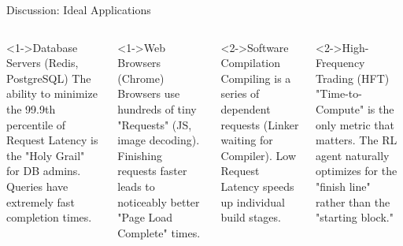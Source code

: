 \documentclass[aspectratio=169]{beamer}
\begin{document}
\begin{frame}{Discussion: Ideal Applications}
  \begin{columns}[T]
    
      \begin{block}<1->{Database Servers (Redis, PostgreSQL)}
        \small The ability to minimize the 99.9th percentile of Request Latency is the "Holy Grail" for DB admins. Queries have extremely fast completion times.
      \end{block}
      
      \vspace{4pt}
      
      \begin{block}<1->{Web Browsers (Chrome)}
        \small Browsers use hundreds of tiny "Requests" (JS, image decoding). Finishing requests faster leads to noticeably better "Page Load Complete" times.
      \end{block}

      \begin{exampleblock}<2->{Software Compilation}
        \small Compiling is a series of dependent requests (Linker waiting for Compiler). Low Request Latency speeds up individual build stages.
      \end{exampleblock}
      
      \vspace{4pt}
      
      \begin{exampleblock}<2->{High-Frequency Trading (HFT)}
        \small "Time-to-Compute" is the only metric that matters. The RL agent naturally optimizes for the "finish line" rather than the "starting block."
      \end{exampleblock}

  \end{columns}
\end{frame}
\end{document}
